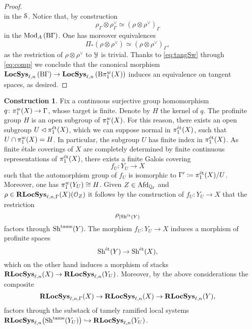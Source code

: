 \documentclass[10pt,a4paper]{amsart}
\numberwithin{equation}{subsection}
\theoremstyle{plain}
\theoremstyle{definition}
\newtheorem{construction}[theorem]{Construction}
\theoremstyle{remark}
\numberwithin{equation}{section}
\begin{document}
\begin{proof}
\begin{equation}
	\end{equation}
in the \infcat $\mathcal S$. Notice that, by construction
	\begin{equation} \label{eq:gamma}
		\rho_{\Gamma} \otimes \rho_{\Gamma}^{\vee} \simeq \left( \rho \otimes \rho^{\vee} \right)_{\Gamma}
	\end{equation}
in the \infcat $\mathrm{Mod}_A \left( \mathrm B \Gamma \right)$. One has moreover equivalences 
	\begin{equation} \label{eq:comp}
		\Pi_* \left( \rho \otimes \rho^\vee \right)
		\simeq \left( \rho \otimes \rho^\vee \right)_{\Gamma},
	\end{equation}
as the restriction of $\rho \otimes \rho^\vee$ to $\mathcal Y$ is trivial. Thanks to \eqref{eq:tangSw} through \eqref{eq:comp}
we conclude that the canonical morphism $\mathbf{LocSys}_{\ell, n} \left( \mathrm B \Gamma \right) \to \mathbf{LocSys}_{\ell, n} \left( \mathrm B \pi_1^w(X) \right)$ induces an equivalence on tangent spaces, as desired.
\end{proof}

\begin{construction} \label{const:imp}
Fix a continuous surjective group homomorphism $q \colon \pi_1^w(X) \to \Gamma$, whose target is finite. Denote by $H$ the kernel of $q$. The profinite group $H$ is an open subgroup of $\pi_1^w(X)$. For this reason, there exists an open subgroup
$U \lhd \pi_1^{\text{\'et}}(X)$,
which we can suppose normal in $\pi_1^{\text{\'et}}(X)$, such that $U \cap \pi_1^w(X) = H$. In particular, the subgroup $U$ has finite index in $\pi_1^{\text{\'et}}(X)$. As finite \'etale coverings of $X$ are completely determined by finite continuous representations of
$\pi_1^{\text{\'et}}(X)$, there exists a finite Galois covering 
	\[
		f_U \colon Y_U \to X
	\]
such that the automorphism group of $f_U$ is isomorphic to $\Gamma ' \coloneqq \pi_1^{\text{\'et}}(X) / U$. Moreover, one has $\pi_1^w(Y_U) \cong H$. Given  $Z \in \mathrm{Afd}_{\mathbb{Q}_\ell}$ and $\rho \in \mathbf R \mathbf{LocSys}_{\ell, n, \Gamma}(X) (\mathcal{O}_Z)$ it follows by the construction of $f_U \colon
Y_U \to X$ that the restriction 
	\[
		\rho_{
		\vert \mathrm{Sh}^{\text{\'et}}(Y)}
	\]
factors through $\mathrm{Sh}^{\mathrm{tame}}(Y)$. The morphism $f_U \colon Y_U \to X$ induces a morphism of profinite spaces
	\[
		\mathrm{Sh}^{\text{\'et}}(Y) \to \mathrm{Sh}^{\text{\'et}}(X),
	\]
which on the other hand induces a morphism of stacks $\mathbf R \mathbf{LocSys}_{\ell, n}(X) \to \mathbf R \mathbf{LocSys}_{\ell, n}(Y_U)$. Moreover, by the above considerations the composite
	\[
		\mathbf R \mathbf{LocSys}_{\ell, n, \Gamma}(X) \to \mathbf R \mathbf{LocSys}_{\ell, n}(X) \to \mathbf R \mathbf{LocSys}_{\ell, n}(Y),
	\]	
factors through the substack of tamely ramified local systems $\mathbf R \mathbf{LocSys}_{\ell, n} \big(\mathrm{Sh}^{\mathrm{tame}}(Y_U) \big) \hookrightarrow \mathbf R \mathbf{LocSys}_{\ell, n}(Y_U)$.
\end{construction}
\end{document}
